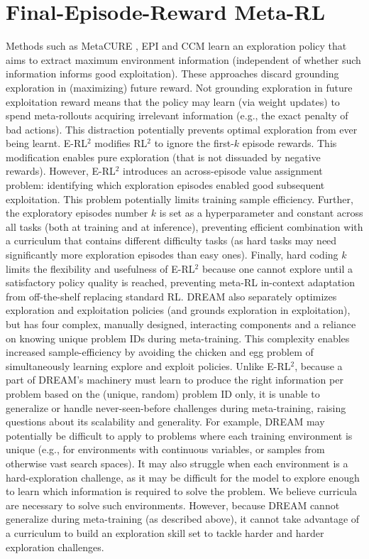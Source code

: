\documentclass{article}
\begin{document}
\section{Final-Episode-Reward Meta-RL} \label{FinalEpisodeRelated}
Methods such as MetaCURE \citep{metacure}, EPI \citep{EPI} and CCM \citep{CCM} learn an exploration policy that aims to extract maximum environment information (independent of whether such information informs good exploitation). These approaches discard grounding exploration in (maximizing) future reward. Not grounding exploration in future exploitation reward means that the policy may learn (via weight updates) to spend meta-rollouts acquiring irrelevant information (e.g., the exact penalty of bad actions). This distraction potentially prevents optimal exploration from ever being learnt.
E-RL\(^2\) \citep{stadie2019considerations} modifies RL\(^2\) to ignore the first-$k$ episode rewards. This modification enables pure exploration (that is not dissuaded by negative rewards). However, E-RL\(^2\) introduces an across-episode value assignment problem: identifying which exploration episodes enabled good subsequent exploitation. This problem potentially limits training sample efficiency. Further, the exploratory episodes number $k$ is set as a hyperparameter and constant across all tasks (both at training and at inference), preventing efficient combination with a curriculum that contains different difficulty tasks (as hard tasks may need significantly more exploration episodes than easy ones). Finally, hard coding $k$ limits the flexibility and usefulness of E-RL\(^2\) because one cannot explore until a satisfactory policy quality is reached, preventing meta-RL in-context adaptation from off-the-shelf replacing standard RL.
DREAM \citep{liu2021decoupling} also separately optimizes exploration and exploitation policies (and grounds exploration in exploitation), but has four complex, manually designed, interacting components and a reliance on knowing unique problem IDs during meta-training. This complexity enables increased sample-efficiency by avoiding the chicken and egg problem of simultaneously learning explore and exploit policies.
Unlike E-RL\(^2\), because a part of DREAM’s machinery must learn to produce the right information per problem based on the (unique, random) problem ID only, it is unable to generalize or handle never-seen-before challenges during meta-training, raising questions about its scalability and generality. For example, DREAM may potentially be difficult to apply to problems where each training environment is unique (e.g., for environments with continuous variables, or samples from otherwise vast search spaces). It may also struggle when each environment is a hard-exploration challenge, as it may be difficult for the model to explore enough to learn which information is required to solve the problem. We believe curricula are necessary to solve such environments. However, because DREAM cannot generalize during meta-training (as described above), it cannot take advantage of a curriculum to build an exploration skill set to tackle harder and harder exploration challenges.
\end{document}
